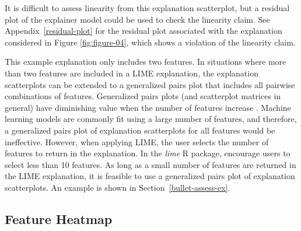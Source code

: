 \documentclass[AMS,STIX2COL]{WileyNJD-v2}\usepackage[]{graphicx}\usepackage[]{color}
\begin{document}
It is difficult to assess linearity from this explanation scatterplot, but a residual plot of the explainer model could be used to check the linearity claim. See Appendix~\ref{residual-plot} for the residual plot associated with the explanation considered in Figure \ref{fig:figure-04}, which shows a violation of the linearity claim.

This example explanation only includes two features. In situations where more than two features are included in a LIME explanation, the explanation scatterplots can be extended to a generalized pairs plot \citep{emerson:2013} that includes all pairwise combinations of features. Generalized pairs plots (and scatterplot matrices in general) have diminishing value when the number of features increase \citep{jensen:2011} \citep{sweller:2011}. Machine learning models are commonly fit using a large number of features, and therefore, a generalized pairs plot of explanation scatterplots for all features would be ineffective. However, when applying LIME, the user selects the number of features to return in the explanation. In the \emph{lime} R package, \citet{pedersen:2020} encourage users to select less than 10 features. As long as a small number of features are returned in the LIME explanation,  it is feasible to use a generalized pairs plot of explanation scatterplots. An example is shown in Section~\ref{bullet-assess-ex}.

\subsection{Feature Heatmap} \label{feat-heat}
\end{document}
